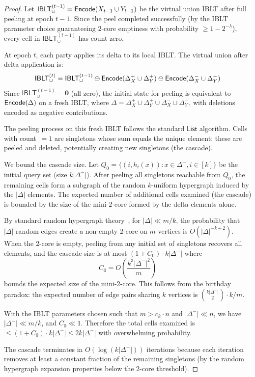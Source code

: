 \documentclass[letterpaper,twocolumn,10pt]{article}
\theoremstyle{definition}
\newcommand{\List}{\mathsf{List}}\newcommand{\uPeel}{\mathsf{uPeel}}
\begin{document}
\begin{proof}
Let $\mathsf{IBLT}_\cup^{(t-1)} = \mathsf{Encode}(X_{t-1} \cup Y_{t-1})$ be the
virtual union IBLT after full peeling at epoch $t-1$. Since the peel
completed successfully (by the IBLT parameter choice guaranteeing
$2$-core emptiness with probability $\geq 1 - 2^{-\lambda}$), every
cell in $\mathsf{IBLT}_\cup^{(t-1)}$ has count zero.

At epoch $t$, each party applies its delta to its local IBLT. The
virtual union after delta application is:
\[
\mathsf{IBLT}_\cup^{(t)} = \mathsf{IBLT}_\cup^{(t-1)}
  \oplus \mathsf{Encode}(\Delta^+_X \cup \Delta^+_Y)
  \ominus \mathsf{Encode}(\Delta^-_X \cup \Delta^-_Y)
\]
Since $\mathsf{IBLT}_\cup^{(t-1)} = \mathbf{0}$ (all-zero), the initial
state for peeling is equivalent to $\mathsf{Encode}(\Delta)$ on a fresh IBLT,
where $\Delta = \Delta^+_X \cup \Delta^+_Y \cup \Delta^-_X \cup
\Delta^-_Y$, with deletions encoded as negative contributions.

The peeling process on this fresh IBLT follows the standard $\List$
algorithm. Cells with count~$=1$ are singletons whose sum equals the
unique element; these are peeled and deleted, potentially creating new
singletons (the cascade).

We bound the cascade size. Let $Q_0 = \{(i, h_i(x)) : x \in \Delta^-, i
\in [k]\}$ be the initial query set (size $k|\Delta^-|$). After peeling
all singletons reachable from $Q_0$, the remaining cells form a subgraph
of the random $k$-uniform hypergraph induced by the $|\Delta|$ elements.
The expected number of additional cells examined (the cascade) is bounded
by the size of the mini-$2$-core formed by the delta elements alone.

By standard random hypergraph theory~\cite{GM11}, for $|\Delta| \ll
m/k$, the probability that $|\Delta|$ random edges create a non-empty
$2$-core on $m$ vertices is $O(|\Delta|^{-k+2})$. When the $2$-core is
empty, peeling from any initial set of singletons recovers all elements,
and the cascade size is at most $(1 + C_0) \cdot k|\Delta^-|$ where
\[
C_0 = O\left(\frac{k^3 |\Delta^-|^2}{m}\right)
\]
bounds the expected size of the mini-$2$-core. This follows from the
birthday paradox: the expected number of edge pairs sharing $k$ vertices
is $\binom{k|\Delta^-|}{2} \cdot k/m$.

With the IBLT parameters chosen such that $m > c_k \cdot n$ and
$|\Delta^-| \ll n$, we have $|\Delta^-| \ll m/k$, and $C_0 \ll 1$.
Therefore the total cells examined is $\leq (1 + C_0) \cdot k|\Delta^-|
\leq 2k|\Delta^-|$ with overwhelming probability.

The cascade terminates in $O(\log(k|\Delta^-|))$ iterations because each
iteration removes at least a constant fraction of the remaining
singletons (by the random hypergraph expansion properties below the
$2$-core threshold).
\end{proof}
\end{document}
